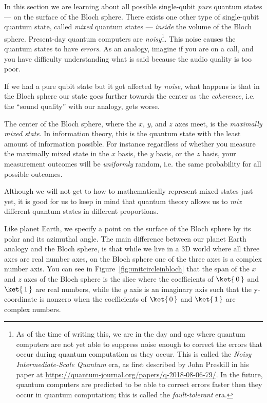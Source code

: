 \documentclass{article}
\theoremstyle{definition}
\newcommand{\kz}[1]{\ket{\,#1\,}}
\begin{document}
\begin{note}
In this section we are learning about all possible single-qubit \textit{pure} quantum states --- on the surface of the Bloch sphere.
There exists one other type of single-qubit quantum state, called \textit{mixed} quantum states --- \textit{inside} the volume of the Bloch sphere.
Present-day quantum computers are \textit{noisy}\footnote{As of the time of writing this, we are in the day and age where quantum computers are not yet able to suppress noise enough to correct the errors that occur during quantum computation as they occur.  This is called the \textit{Noisy Intermediate-Scale Quantum} era, as first described by John Preskill in his paper at \url{https://quantum-journal.org/papers/q-2018-08-06-79/}.  In the future, quantum computers are predicted to be able to correct errors faster then they occur in quantum computation; this is called the \textit{fault-tolerant} era.}.  This noise causes the quantum states to have \textit{errors}.  As an analogy, imagine if you are on a call, and you have difficulty understanding what is said because the audio quality is too poor.

If we had a pure qubit state but it got affected by \textit{noise}, what happens is that in the Bloch sphere our state goes further towards the center as the \textit{coherence}, i.e. the ``sound quality'' with our analogy, gets worse.

The center of the Bloch sphere, where the $x$, $y$, and $z$ axes meet, is the \textit{maximally mixed state}.  In information theory, this is the quantum state with the least amount of information possible.  For instance regardless of whether you measure the maximally mixed state in the $x$ basis, the $y$ basis, or the $z$ basis, your measurement outcomes will be \textit{uniformly} random, i.e. the same probability for all possible outcomes.

Although we will not get to how to mathematically represent mixed states just yet, it is good for us to keep in mind that quantum theory allows us to \textit{mix} different quantum states in different proportions.
\end{note}

Like planet Earth, we specify a point on the surface of the Bloch sphere by its polar and its azimuthal angle.  The main difference between our planet Earth analogy and the Bloch sphere, is that while we live in a 3D world where all three axes are real number axes, on the Bloch sphere one of the three axes is a complex number axis.  You can see in Figure~\ref{fig:unitcircleinbloch} that the span of the $x$ and $z$ axes of the Bloch sphere is the slice where the coefficients of $\kz0$ and $\kz1$ are real numbers, while the $y$ axis is an imaginary axis such that the y-coordinate is nonzero when the coefficients of $\kz0$ and $\kz1$ are complex numbers.
\end{document}
